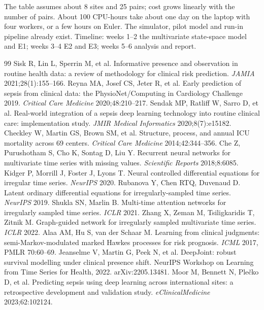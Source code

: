 \documentclass[11pt,a4paper]{article}
\begin{document}
The table assumes about 8 sites and 25 pairs; cost grows linearly with the number of pairs. About 100 CPU-hours take about one day on the laptop with four workers, or a few hours on Euler. The simulator, pilot model and run-in pipeline already exist. Timeline: weeks 1--2 the multivariate state-space model and E1; weeks 3--4 E2 and E3; weeks 5--6 analysis and report.


\begin{thebibliography}{99}\small
\setlength{\itemsep}{0pt}
 Sisk R, Lin L, Sperrin M, et al. Informative presence and observation in routine health data: a review of methodology for clinical risk prediction. \emph{JAMIA} 2021;28(1):155--166.
 Reyna MA, Josef CS, Jeter R, et al. Early prediction of sepsis from clinical data: the PhysioNet/Computing in Cardiology Challenge 2019. \emph{Critical Care Medicine} 2020;48:210--217.
 Sendak MP, Ratliff W, Sarro D, et al. Real-world integration of a sepsis deep learning technology into routine clinical care: implementation study. \emph{JMIR Medical Informatics} 2020;8(7):e15182.
 Checkley W, Martin GS, Brown SM, et al. Structure, process, and annual ICU mortality across 69 centers. \emph{Critical Care Medicine} 2014;42:344--356.
 Che Z, Purushotham S, Cho K, Sontag D, Liu Y. Recurrent neural networks for multivariate time series with missing values. \emph{Scientific Reports} 2018;8:6085.
 Kidger P, Morrill J, Foster J, Lyons T. Neural controlled differential equations for irregular time series. \emph{NeurIPS} 2020.
 Rubanova Y, Chen RTQ, Duvenaud D. Latent ordinary differential equations for irregularly-sampled time series. \emph{NeurIPS} 2019.
 Shukla SN, Marlin B. Multi-time attention networks for irregularly sampled time series. \emph{ICLR} 2021.
 Zhang X, Zeman M, Tsiligkaridis T, Zitnik M. Graph-guided network for irregularly sampled multivariate time series. \emph{ICLR} 2022.
 Alaa AM, Hu S, van der Schaar M. Learning from clinical judgments: semi-Markov-modulated marked Hawkes processes for risk prognosis. \emph{ICML} 2017, PMLR 70:60--69.
 Jeanselme V, Martin G, Peek N, et al. DeepJoint: robust survival modelling under clinical presence shift. NeurIPS Workshop on Learning from Time Series for Health, 2022. arXiv:2205.13481.
 Moor M, Bennett N, Ple\v{c}ko D, et al. Predicting sepsis using deep learning across international sites: a retrospective development and validation study. \emph{eClinicalMedicine} 2023;62:102124.

\end{thebibliography}
\end{document}
